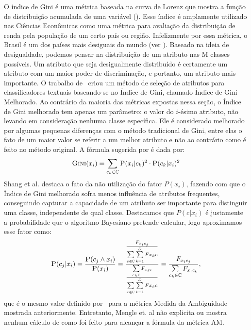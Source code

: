 \begin{description}
O índice de Gini é uma métrica baseada na curva de Lorenz que mostra a função de distribuição acumulada de uma variável (\cite{Shang07}). Esse índice é amplamente utilizado nas Ciências Econômicas como uma métrica para avaliação da distribuição de renda pela população de um certo país ou região. Infelizmente por essa métrica, o Brasil é um dos países mais desiguais do mundo (ver \cite{cia-gini}). 
Baseado na ideia de desigualdade, podemos pensar na distribuição de um atributo nas M classes possíveis. Um atributo que seja desigualmente distribuído é certamente um atributo com um maior poder de discriminação, e portanto, um atributo mais importante. O trabalho de~\cite{Shang07} criou um método de seleção de atributos para classificadores textuais baseando-se no Índice de Gini, chamado Índice de Gini Melhorado. Ao contrário da maioria das métricas expostas nessa seção, o Índice de Gini melhorado tem apenas um parâmetro: o valor do $i$-ésimo atributo, não levando em consideração nenhuma classe específica. Ele é considerado melhorado por algumas pequenas diferenças com o método tradicional de Gini, entre elas o fato de um maior valor se referir a um melhor atributo e não ao contrário como é feito no método original. A fórmula sugerida por \cite{Shang07} é dada por:
\begin{equation}\label{eqn::gini}
 \textsc{Gini}(x_i) = \sum\limits_{c_k \in \mathbb{C}} \textsc{P}(x_i|c_k)^2 \cdot \textsc{P}(c_k|x_i)^2
\end{equation}
Shang et al. destaca o fato da não utilização do fator $P(x_i)$, fazendo com que o Índice de Gini melhorado sofra menos influência de atributos frequentes, conseguindo capturar a capacidade de um atributo ser importante para distinguir uma classe, independente de qual classe. Destacamos que $P(c|x_i)$ é justamente a probabilidade que o algoritmo Bayesiano pretende calcular, logo aproximamos esse fator como:
\begin{equation}\label{eqn::gini}
 \textsc{P}(c_j|x_i) = \frac{ \textsc{P}(c_j \wedge x_i) } {\textsc{P}(x_i) } = \frac{ \frac{ F_{x_ic_j}}{  \sum\limits_{c \in \mathbb{C}} \sum\limits_{k=1}^{D} {Fx_kc}  } } { \frac{\sum\limits_{c \in \mathbb{C}} F_{x_ic}}{ \sum\limits_{c \in \mathbb{C}} \sum\limits_{k=1}^{D} {Fx_kc}}} = \frac{ F_{x_{i}c_{j}}}{\sum\limits_{c_k \in \mathbb{C}} F_{x_{i}c_{k}}},
\end{equation}
que é o mesmo valor definido por~\cite{Mengle08} para a métrica Medida da Ambiguidade mostrada anteriormente. Entretanto, Mengle et. al não explicita ou mostra nenhum cálculo de como foi feito para alcançar a fórmula da métrica \textsc{AM}. 


\end{description}
